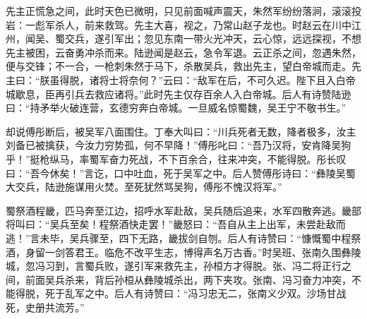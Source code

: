 先主正慌急之间，此时天色已微明，只见前面喊声震天，朱然军纷纷落涧，滚滚投岩：一彪军杀人，前来救驾。先主大喜，视之，乃常山赵子龙也。时赵云在川中江州，闻吴、蜀交兵，遂引军出；忽见东南一带火光冲天，云心惊，远远探视，不想先主被困，云奋勇冲杀而来。陆逊闻是赵云，急令军退。云正杀之间，忽遇朱然，便与交锋；不一合，一枪刺朱然于马下，杀散吴兵，救出先主，望白帝城而走。先主曰：“朕虽得脱，诸将士将奈何？”云曰：“敌军在后，不可久迟。陛下且入白帝城歇息，臣再引兵去救应诸将。”此时先主仅存百余人入白帝城。后人有诗赞陆逊曰：“持矛举火破连营，玄德穷奔白帝城。一旦威名惊蜀魏，吴王宁不敬书生。”

却说傅彤断后，被吴军八面围住。丁奉大叫曰：“川兵死者无数，降者极多，汝主刘备已被擒获，今汝力穷势孤，何不早降！”傅彤叱曰：“吾乃汉将，安肯降吴狗乎！”挺枪纵马，率蜀军奋力死战，不下百余合，往来冲突，不能得脱。彤长叹曰：“吾今休矣！”言讫，口中吐血，死于吴军之中。后人赞傅彤诗曰：“彝陵吴蜀大交兵，陆逊施谋用火焚。至死犹然骂吴狗，傅彤不愧汉将军。”

蜀祭酒程畿，匹马奔至江边，招呼水军赴敌，吴兵随后追来，水军四散奔逃。畿部将叫曰：“吴兵至矣！程祭酒快走罢！”畿怒曰：“吾自从主上出军，未尝赴敌而逃！”言未毕，吴兵骤至，四下无路，畿拔剑自刎。后人有诗赞曰：“慷慨蜀中程祭酒，身留一剑答君王。临危不改平生志，博得声名万古香。”时吴班、张南久围彝陵城，忽冯习到，言蜀兵败，遂引军来救先主，孙桓方才得脱。张、冯二将正行之间，前面吴兵杀来，背后孙桓从彝陵城杀出，两下夹攻。张南、冯习奋力冲突，不能得脱，死于乱军之中。后人有诗赞曰：“冯习忠无二，张南义少双。沙场甘战死，史册共流芳。”

